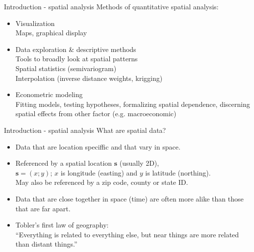 \documentclass{beamer}
\begin{document}
\begin{frame}{Introduction - spatial analysis}
Methods of quantitative spatial analysis:\\
\bigskip
\begin{itemize}
    \item Visualization \\Maps, graphical display
    \bigskip
    \item Data exploration \& descriptive methods \\Tools to broadly look at spatial patterns\\
    Spatial statistics (semivariogram)\\
    Interpolation (inverse distance weights, krigging)
    \bigskip
    \item Econometric modeling \\Fitting models, testing hypotheses, formalizing spatial dependence, discerning spatial effects from other factor (e.g. macroeconomic)
\end{itemize}
\end{frame}
\begin{frame}{Introduction - spatial analysis}
 What are spatial data?\\
\bigskip
\begin{itemize}
    \item Data that are location speciffic and that vary in space.
    \medskip
    \item Referenced by a spatial location $\bm{s}$ (usually 2D),  \\$\bm{s} = (x; y)$; $x$ is longitude (easting) and $y$ is latitude (northing). \\ \medskip
    May also be referenced by a zip code, county or state ID.
    \medskip
    \item Data that are close together in space (time) are often more alike than those that are far apart.
    \medskip
    \item Tobler's first law of geography: \\ ``Everything is related to everything else, but near things are more related than distant things.''
\end{itemize}
\end{frame}
\end{document}
